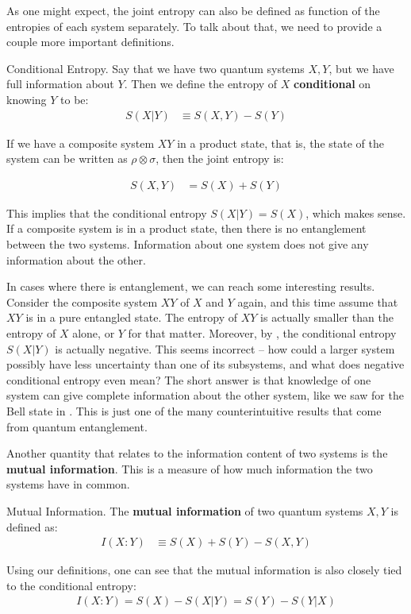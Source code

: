 As one might expect, the joint entropy can also be defined as function of the entropies of each system separately. To talk about that, we need to provide a couple more important definitions.

\begin{definition}{Conditional Entropy.}
    \label{defn:conditional-entropy}
    Say that we have two quantum systems $X,Y$, but we have full information about $Y$. Then we define the entropy of $X$ \textbf{conditional} on knowing $Y$ to be: 
    \begin{align}
        S(X|Y) &\equiv S(X,Y) - S(Y)
    \end{align}
\end{definition}

\begin{example}
    If we have a composite system $XY$ in a product state, that is, the state of the system can be written as $\rho \otimes \sigma$, then the joint entropy is:
\end{example}

\begin{align}
    S(X,Y) &= S(X) + S(Y)
\end{align}

This implies that the conditional entropy $S(X|Y) = S(X)$, which makes sense. If a composite system is in a product state, then there is no entanglement between the two systems. Information about one system does not give any information about the other.

In cases where there is entanglement, we can reach some interesting results. Consider the composite system $XY$ of $X$ and $Y$ again, and this time assume that $XY$ is in a pure entangled state. The entropy of $XY$ is actually smaller than the entropy of $X$ alone, or $Y$ for that matter. Moreover, by , the conditional entropy $S(X|Y)$ is actually negative. This seems incorrect -- how could a larger system possibly have less uncertainty than one of its subsystems, and what does negative conditional entropy even mean? The short answer is that knowledge of one system can give complete information about the other system, like we saw for the Bell state in . This is just one of the many counterintuitive results that come from quantum entanglement.

Another quantity that relates to the information content of two systems is the \textbf{mutual information}. This is a measure of how much information the two systems have in common.

\begin{definition}{Mutual Information.}
    The \textbf{mutual information} of two quantum systems $X,Y$ is defined as:
    \begin{align}
        I(X:Y) &\equiv S(X) + S(Y) - S(X,Y)
    \end{align}
\end{definition}

Using our definitions, one can see that the mutual information is also closely tied to the conditional entropy:
\begin{align}
        I(X:Y) = S(X) - S(X|Y) = S(Y) - S(Y|X)
\end{align}
